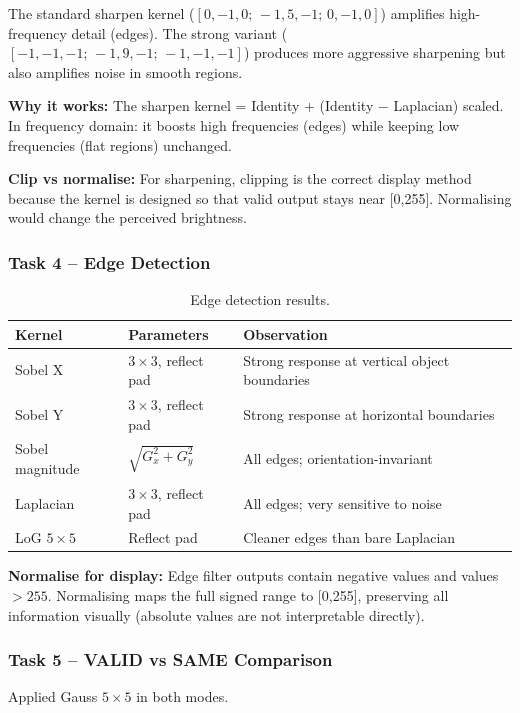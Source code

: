 \documentclass[12pt,a4paper]{article}
\begin{document}
The standard sharpen kernel ($[0,-1,0;\,-1,5,-1;\,0,-1,0]$) amplifies
high-frequency detail (edges). The strong variant ($[-1,-1,-1;\,-1,9,-1;\,-1,-1,-1]$)
produces more aggressive sharpening but also amplifies noise in smooth regions.

\textbf{Why it works:} The sharpen kernel = Identity + (Identity $-$ Laplacian) scaled.
In frequency domain: it boosts high frequencies (edges) while keeping low frequencies
(flat regions) unchanged.

\textbf{Clip vs normalise:} For sharpening, clipping is the correct display method
because the kernel is designed so that valid output stays near [0,255]. Normalising
would change the perceived brightness.

\subsubsection*{Task 4 -- Edge Detection}

\begin{table}[H]
  \centering
  \begin{tabular}{@{}llp{6.5cm}@{}}
    \toprule
    Kernel & Parameters & Observation \\
    \midrule
    Sobel X & $3\times3$, reflect pad & Strong response at vertical object boundaries \\
    Sobel Y & $3\times3$, reflect pad & Strong response at horizontal boundaries \\
    Sobel magnitude & $\sqrt{G_x^2+G_y^2}$ & All edges; orientation-invariant \\
    Laplacian & $3\times3$, reflect pad & All edges; very sensitive to noise \\
    LoG $5\times5$ & Reflect pad & Cleaner edges than bare Laplacian \\
    \bottomrule
  \end{tabular}
  \caption{Edge detection results.}
\end{table}

\textbf{Normalise for display:} Edge filter outputs contain negative values and
values $> 255$. Normalising maps the full signed range to [0,255], preserving all
information visually (absolute values are not interpretable directly).

\subsubsection*{Task 5 -- VALID vs SAME Comparison}

Applied Gauss $5\times5$ in both modes.
\end{document}
